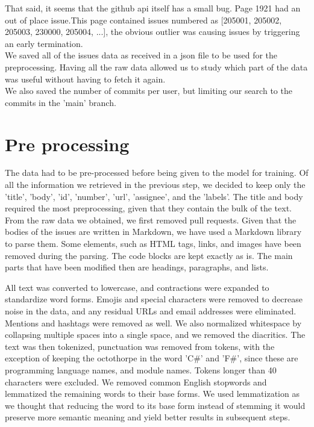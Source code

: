 \documentclass[tikz,10pt,fleqn]{article}
\begin{document}
That said, it seems that the github api itself has a small bug. Page 1921 had an out of place issue.\newpage This page contained issues numbered as [205001, 205002, 205003, 230000, 205004, ...], the obvious outlier was causing issues by triggering an early termination.\\
We saved all of the issues data as received in a json file to be used for the preprocessing. Having all the raw data allowed us to study which part of the data was useful without having to fetch it again.\\

We also saved the number of commits per user, but limiting our search to the commits in the 'main' branch.


\section*{Pre processing}

The data had to be pre-processed before being given to the model for training.  
Of all the information we retrieved in the previous step, we decided to keep only the 'title', 'body', 'id', 'number', 'url', 'assignee', and the 'labels'.  
The title and body required the most preprocessing, given that they contain the bulk of the text.  
From the raw data we obtained, we first removed pull requests.  
Given that the bodies of the issues are written in Markdown, we have used a Markdown library to parse them.  
Some elements, such as HTML tags, links, and images have been removed during the parsing. The code blocks are kept exactly as is.  
The main parts that have been modified then are headings, paragraphs, and lists.

All text was converted to lowercase, and contractions were expanded to standardize word forms. Emojis and special characters were removed to decrease noise in the data, and any residual URLs and email addresses were eliminated. Mentions and hashtags were removed as well. We also normalized whitespace by collapsing multiple spaces into a single space, and we removed the diacritics.  
The text was then tokenized, punctuation was removed from tokens, with the exception of keeping the octothorpe in the word 'C\#' and 'F\#', since these are programming language names, and module names. Tokens longer than 40 characters were excluded. We removed common English stopwords and lemmatized the remaining words to their base forms.  
We used lemmatization as we thought that reducing the word to its base form instead of stemming it would preserve more semantic meaning and yield better results in subsequent steps.
\end{document}
